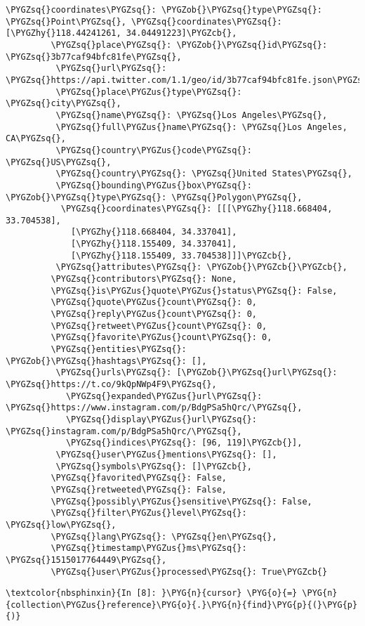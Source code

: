 \documentclass[letterpaper,10pt,english]{sphinxmanual}
\begin{document}
\begin{Verbatim}[commandchars=\\\{\}]
         \PYGZsq{}coordinates\PYGZsq{}: \PYGZob{}\PYGZsq{}type\PYGZsq{}: \PYGZsq{}Point\PYGZsq{}, \PYGZsq{}coordinates\PYGZsq{}: [\PYGZhy{}118.44241261, 34.04491223]\PYGZcb{},
         \PYGZsq{}place\PYGZsq{}: \PYGZob{}\PYGZsq{}id\PYGZsq{}: \PYGZsq{}3b77caf94bfc81fe\PYGZsq{},
          \PYGZsq{}url\PYGZsq{}: \PYGZsq{}https://api.twitter.com/1.1/geo/id/3b77caf94bfc81fe.json\PYGZsq{},
          \PYGZsq{}place\PYGZus{}type\PYGZsq{}: \PYGZsq{}city\PYGZsq{},
          \PYGZsq{}name\PYGZsq{}: \PYGZsq{}Los Angeles\PYGZsq{},
          \PYGZsq{}full\PYGZus{}name\PYGZsq{}: \PYGZsq{}Los Angeles, CA\PYGZsq{},
          \PYGZsq{}country\PYGZus{}code\PYGZsq{}: \PYGZsq{}US\PYGZsq{},
          \PYGZsq{}country\PYGZsq{}: \PYGZsq{}United States\PYGZsq{},
          \PYGZsq{}bounding\PYGZus{}box\PYGZsq{}: \PYGZob{}\PYGZsq{}type\PYGZsq{}: \PYGZsq{}Polygon\PYGZsq{},
           \PYGZsq{}coordinates\PYGZsq{}: [[[\PYGZhy{}118.668404, 33.704538],
             [\PYGZhy{}118.668404, 34.337041],
             [\PYGZhy{}118.155409, 34.337041],
             [\PYGZhy{}118.155409, 33.704538]]]\PYGZcb{},
          \PYGZsq{}attributes\PYGZsq{}: \PYGZob{}\PYGZcb{}\PYGZcb{},
         \PYGZsq{}contributors\PYGZsq{}: None,
         \PYGZsq{}is\PYGZus{}quote\PYGZus{}status\PYGZsq{}: False,
         \PYGZsq{}quote\PYGZus{}count\PYGZsq{}: 0,
         \PYGZsq{}reply\PYGZus{}count\PYGZsq{}: 0,
         \PYGZsq{}retweet\PYGZus{}count\PYGZsq{}: 0,
         \PYGZsq{}favorite\PYGZus{}count\PYGZsq{}: 0,
         \PYGZsq{}entities\PYGZsq{}: \PYGZob{}\PYGZsq{}hashtags\PYGZsq{}: [],
          \PYGZsq{}urls\PYGZsq{}: [\PYGZob{}\PYGZsq{}url\PYGZsq{}: \PYGZsq{}https://t.co/9kQpNWp4F9\PYGZsq{},
            \PYGZsq{}expanded\PYGZus{}url\PYGZsq{}: \PYGZsq{}https://www.instagram.com/p/BdgPSa5hQrc/\PYGZsq{},
            \PYGZsq{}display\PYGZus{}url\PYGZsq{}: \PYGZsq{}instagram.com/p/BdgPSa5hQrc/\PYGZsq{},
            \PYGZsq{}indices\PYGZsq{}: [96, 119]\PYGZcb{}],
          \PYGZsq{}user\PYGZus{}mentions\PYGZsq{}: [],
          \PYGZsq{}symbols\PYGZsq{}: []\PYGZcb{},
         \PYGZsq{}favorited\PYGZsq{}: False,
         \PYGZsq{}retweeted\PYGZsq{}: False,
         \PYGZsq{}possibly\PYGZus{}sensitive\PYGZsq{}: False,
         \PYGZsq{}filter\PYGZus{}level\PYGZsq{}: \PYGZsq{}low\PYGZsq{},
         \PYGZsq{}lang\PYGZsq{}: \PYGZsq{}en\PYGZsq{},
         \PYGZsq{}timestamp\PYGZus{}ms\PYGZsq{}: \PYGZsq{}1515017764449\PYGZsq{},
         \PYGZsq{}user\PYGZus{}processed\PYGZsq{}: True\PYGZcb{}
\end{Verbatim}

%
\begin{Verbatim}[commandchars=\\\{\}]
\textcolor{nbsphinxin}{In [8]: }\PYG{n}{cursor} \PYG{o}{=} \PYG{n}{collection\PYGZus{}reference}\PYG{o}{.}\PYG{n}{find}\PYG{p}{(}\PYG{p}{)}
\end{Verbatim}
\end{document}
